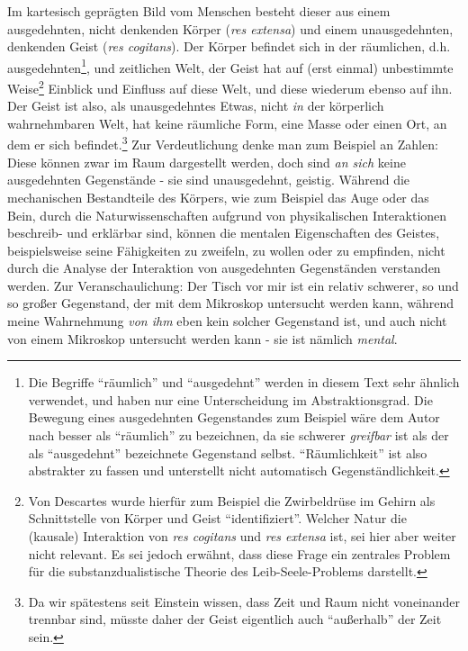 \documentclass[a4paper, 12pt]{article}
\begin{document}
\begin{onehalfspace}
\noindent Im kartesisch geprägten Bild vom Menschen besteht dieser aus einem ausgedehnten, nicht denkenden Körper (\emph{res extensa}) und einem unausgedehnten, denkenden Geist (\emph{res cogitans}). Der Körper befindet sich in der räumlichen, d.h. ausgedehnten\footnote{Die Begriffe "`räumlich"' und "`ausgedehnt"' werden in diesem Text sehr ähnlich verwendet, und haben nur eine Unterscheidung im Abstraktionsgrad. Die Bewegung eines ausgedehnten Gegenstandes zum Beispiel wäre dem Autor nach besser als "`räumlich"' zu bezeichnen, da sie schwerer \emph{greifbar} ist als der als "`ausgedehnt"' bezeichnete Gegenstand selbst. "`Räumlichkeit"' ist also abstrakter zu fassen und unterstellt nicht automatisch Gegenständlichkeit.}, und zeitlichen Welt, der Geist hat auf (erst einmal) unbestimmte Weise\footnote{Von Descartes wurde hierfür zum Beispiel die Zwirbeldrüse im Gehirn als Schnittstelle von Körper und Geist "`identifiziert"'. Welcher Natur die (kausale) Interaktion von \emph{res cogitans} und \emph{res extensa} ist, sei hier aber weiter nicht relevant. Es sei jedoch erwähnt, dass diese Frage ein zentrales Problem für die substanzdualistische Theorie des Leib-Seele-Problems darstellt.} Einblick und Einfluss auf diese Welt, und diese wiederum ebenso auf ihn. Der Geist ist also, als unausgedehntes Etwas, nicht \emph{in} der körperlich wahrnehmbaren Welt, hat keine räumliche Form, eine Masse oder einen Ort, an dem er sich befindet.\footnote{Da wir spätestens seit Einstein wissen, dass Zeit und Raum nicht voneinander trennbar sind, müsste daher der Geist eigentlich auch "`außerhalb"' der Zeit sein.} Zur Verdeutlichung denke man zum Beispiel an Zahlen: Diese können zwar im Raum dargestellt werden, doch sind \emph{an sich} keine ausgedehnten Gegenstände - sie sind unausgedehnt, geistig. Während die mechanischen Bestandteile des Körpers, wie zum Beispiel das Auge oder das Bein, durch die Naturwissenschaften aufgrund von physikalischen Interaktionen beschreib- und erklärbar sind, können die mentalen Eigenschaften des Geistes, beispielsweise seine Fähigkeiten zu zweifeln, zu wollen oder zu empfinden, nicht durch die Analyse der Interaktion von ausgedehnten Gegenständen verstanden werden. Zur Veranschaulichung: Der Tisch vor mir ist ein relativ schwerer, so und so großer Gegenstand, der mit dem Mikroskop untersucht werden kann, während meine Wahrnehmung \emph{von ihm} eben kein solcher Gegenstand ist, und auch nicht von einem Mikroskop untersucht werden kann - sie ist nämlich \emph{mental}. 


\end{onehalfspace}
\end{document}
